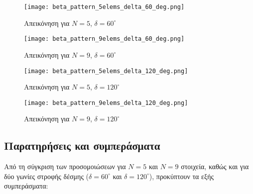 \documentclass[a4paper,12pt]{report}
\begin{document}
\begin{figure}[H]
\centering
\begin{minipage}{0.48\textwidth}
    \centering
    \texttt{[image: beta\_pattern\_5elems\_delta\_60\_deg.png]}
    \caption{Απεικόνηση για \(N=5\), \(\delta=60^\circ\)}
\end{minipage}
\hfill
\begin{minipage}{0.48\textwidth}
    \centering
    \texttt{[image: beta\_pattern\_9elems\_delta\_60\_deg.png]}
    \caption{Απεικόνηση για \(N=9\), \(\delta=60^\circ\)}
\end{minipage}
\vspace{0.3cm}
\begin{minipage}{0.48\textwidth}
    \centering
    \texttt{[image: beta\_pattern\_5elems\_delta\_120\_deg.png]}
    \caption{Απεικόνηση για \(N=5\), \(\delta=120^\circ\)}
\end{minipage}
\hfill
\begin{minipage}{0.48\textwidth}
    \centering
    \texttt{[image: beta\_pattern\_9elems\_delta\_120\_deg.png]}
    \caption{Απεικόνηση για \(N=9\), \(\delta=120^\circ\)}
\end{minipage}
\end{figure}

\subsection{Παρατηρήσεις και συμπεράσματα}

Από τη σύγκριση των προσομοιώσεων για \( N = 5 \) και \( N = 9 \) στοιχεία, καθώς και για δύο γωνίες στροφής δέσμης (\( \delta = 60^\circ \) και \( \delta = 120^\circ \)), προκύπτουν τα εξής συμπεράσματα:
\end{document}
